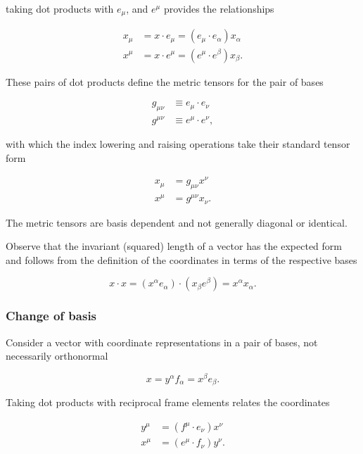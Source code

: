 taking dot products with $e_\mu$, and $e^\mu$ provides the relationships

\begin{align}\label{eqn:grahamSchmidtLorentz:1000}
x_\mu &= x \cdot e_\mu = (e_\mu \cdot e_\alpha) x_\alpha \\
x^\mu &= x \cdot e^\mu = (e^\mu \cdot e^\beta) x_\beta.
\end{align}

These pairs of dot products define the metric tensors for the pair of bases

\begin{align}\label{eqn:grahamSchmidtLorentz:1020}
g_{\mu \nu} &\equiv e_\mu \cdot e_\nu \\
g^{\mu \nu} &\equiv e^\mu \cdot e^\nu,
\end{align}

with which the index lowering and raising operations take their standard tensor form

\begin{align}\label{eqn:grahamSchmidtLorentz:1040}
x_\mu &= g_{\mu \nu} x^\nu \\
x^\mu &= g^{\mu \nu} x_\nu.
\end{align}

The metric tensors are basis dependent and not generally diagonal or identical.

Observe that the invariant (squared) length of a vector has the expected form and follows from the definition of the coordinates in terms of the respective bases

\begin{equation}\label{eqn:grahamSchmidtLorentz:1060}
x \cdot x = (x^\alpha e_\alpha) \cdot (x_\beta e^\beta) = x^\alpha x_\alpha.
\end{equation}

\subsubsection{Change of basis}

Consider a vector with coordinate representations in a pair of bases, not necessarily orthonormal

\begin{equation}\label{eqn:grahamSchmidtLorentz:1080}
x = y^\alpha f_\alpha = x^\beta e_\beta.
\end{equation}

Taking dot products with reciprocal frame elements relates the coordinates

\begin{align}\label{eqn:grahamSchmidtLorentz:1100}
y^\mu &= (f^\mu \cdot e_\nu ) x^\nu \\
x^\mu &= (e^\mu \cdot f_\nu) y^\nu.
\end{align}

